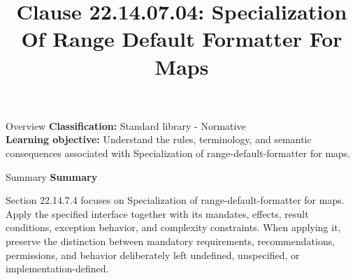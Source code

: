 \documentclass[10pt,letterpaper]{article}
\title{Clause 22.14.07.04: Specialization Of Range Default Formatter For Maps}
\author{}
\date{}
\begin{document}
\maketitle
\begin{CornellOverviewBox}{Overview}
\textbf{Classification:} Standard library - Normative\\[2pt]
\textbf{Learning objective:} Understand the rules, terminology, and semantic consequences associated with Specialization of range-default-formatter for maps.
\end{CornellOverviewBox}\begin{CornellSummaryBox}{Summary}
{\sffamily\bfseries\color{Accent} Summary}\par\vspace{3pt}Section 22.14.7.4 focuses on Specialization of range-default-formatter for maps. Apply the specified interface together with its mandates, effects, result conditions, exception behavior, and complexity constraints. When applying it, preserve the distinction between mandatory requirements, recommendations, permissions, and behavior deliberately left undefined, unspecified, or implementation-defined.
\end{CornellSummaryBox}
\end{document}

